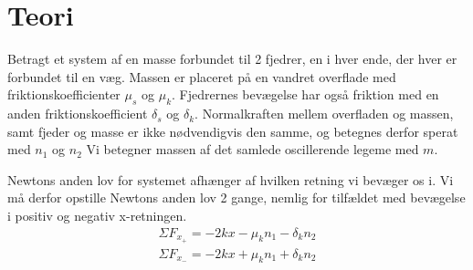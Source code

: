 \chapter{Teori}
Betragt et system af en masse forbundet til 2 fjedrer, en i hver ende, der hver er forbundet til en væg. 
Massen er placeret på en vandret overflade med friktionskoefficienter $\mu_s$ og $\mu_k$. 
Fjedrernes bevægelse har også friktion med en anden friktionskoefficient $\delta_s$ og $\delta_k$. 
Normalkraften mellem overfladen og massen, samt fjeder og masse er ikke nødvendigvis den samme, og betegnes derfor sperat med $n_1$ og $n_2$
Vi betegner massen af det samlede oscillerende legeme med $m$. 

Newtons anden lov for systemet afhænger af hvilken retning vi bevæger os i. 
Vi må derfor opstille Newtons anden lov 2 gange, nemlig for tilfældet med bevægelse i positiv og negativ x-retningen.
\begin{align}
    \Sigma F_{x_+} = -2kx - \mu_k n_1 - \delta_k n_2 \\
    \Sigma F_{x_-} = -2kx + \mu_k n_1 + \delta_k n_2
\end{align}

